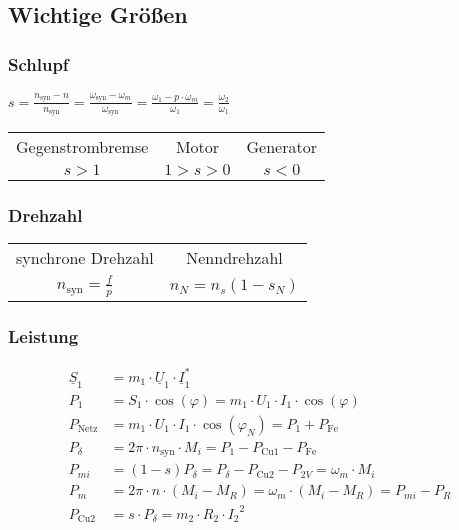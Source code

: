 \begin{sectionbox}
\subsection{Wichtige Größen}
\subsubsection{Schlupf}
\begin{emphbox}
$s = \frac{n_\text{syn} - n}{n_\text{syn}} = \frac{\omega_\text{syn} - \omega_m}{\omega_\text{syn}} = \frac{\omega_1 - p\cdot\omega_m}{\omega_1} = \frac{\omega_2}{\omega_1}$
\end{emphbox}
\begin{tabularx}{\columnwidth}{CCC}
Gegenstrombremse & Motor & Generator\\
$s > 1$ & $1 > s > 0$ & $s < 0$
\end{tabularx}

\subsubsection{Drehzahl}
\begin{tabularx}{\columnwidth}{CC}
synchrone Drehzahl & Nenndrehzahl\\
$n_\text{syn} = \frac{f}{p}$ & $n_N = n_s (1-s_N)$
\end{tabularx}

\subsubsection{Leistung}
\begin{align*}
\underline{S}_1 &= m_1\cdot \underline{U}_1\cdot\underline{I}_1^*\\
P_1 &= S_1 \cdot\cos{(\varphi)} = m_1\cdot U_1\cdot I_1\cdot\cos{(\varphi)}\\
P_\text{Netz} &= m_1\cdot U_1\cdot I_1\cdot\cos{(\varphi_N)} = P_1 + P_\text{Fe}\\
P_\delta &= 2\pi\cdot n_\text{syn}\cdot M_i = P_1 - P_{\text{Cu}1} - P_\text{Fe}\\
P_{mi} &= (1-s)P_\delta = P_\delta - P_{\text{Cu}2} - P_{2V} = \omega_m\cdot M_i\\
P_m &= 2\pi\cdot n\cdot (M_i - M_R) = \omega_m\cdot (M_i - M_R) = P_{mi} - P_R\\
P_{\text{Cu}2} &= s\cdot P_\delta = m_2\cdot R_2\cdot {I_2}^2\\
\end{align*}


\end{sectionbox}
